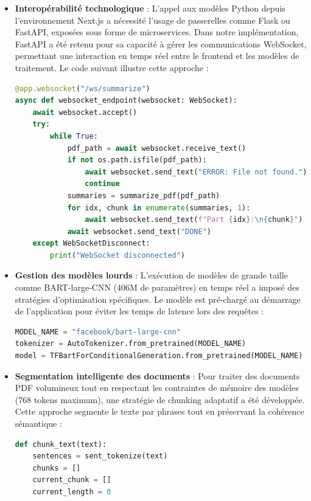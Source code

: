 \documentclass[12pt]{rapportPfe}
\begin{document}
\begin{itemize}
    \item \textbf{Interopérabilité technologique} : L'appel aux modèles Python depuis l'environnement Next.js a nécessité l'usage de passerelles comme Flask ou FastAPI, exposées sous forme de microservices. Dans notre implémentation, FastAPI a été retenu pour sa capacité à gérer les communications WebSocket, permettant une interaction en temps réel entre le frontend et les modèles de traitement. Le code suivant illustre cette approche :

\newpage
\begin{lstlisting}[language=Python, caption=Endpoint WebSocket pour la summarisation]
@app.websocket("/ws/summarize")
async def websocket_endpoint(websocket: WebSocket):
    await websocket.accept()
    try:
        while True:
            pdf_path = await websocket.receive_text()
            if not os.path.isfile(pdf_path):
                await websocket.send_text("ERROR: File not found.")
                continue
            summaries = summarize_pdf(pdf_path)
            for idx, chunk in enumerate(summaries, 1):
                await websocket.send_text(f"Part {idx}:\n{chunk}")
            await websocket.send_text("DONE")
    except WebSocketDisconnect:
        print("WebSocket disconnected")
    \end{lstlisting}

    \item \textbf{Gestion des modèles lourds} : L'exécution de modèles de grande taille comme BART-large-CNN (406M de paramètres) en temps réel a imposé des stratégies d'optimisation spécifiques. Le modèle est pré-chargé au démarrage de l'application pour éviter les temps de latence lors des requêtes :
    
    \begin{lstlisting}[language=Python, caption=Initialisation du modèle BART]
MODEL_NAME = "facebook/bart-large-cnn"
tokenizer = AutoTokenizer.from_pretrained(MODEL_NAME)
model = TFBartForConditionalGeneration.from_pretrained(MODEL_NAME)
    \end{lstlisting}

    \item \textbf{Segmentation intelligente des documents} : Pour traiter des documents PDF volumineux tout en respectant les contraintes de mémoire des modèles (768 tokens maximum), une stratégie de chunking adaptatif a été développée. Cette approche segmente le texte par phrases tout en préservant la cohérence sémantique :
    \newpage
    \begin{lstlisting}[language=Python, caption=Algorithme de segmentation adaptatif]
def chunk_text(text):
    sentences = sent_tokenize(text)
    chunks = []
    current_chunk = []
    current_length = 0
    

\end{lstlisting}
\end{itemize}
\end{document}
